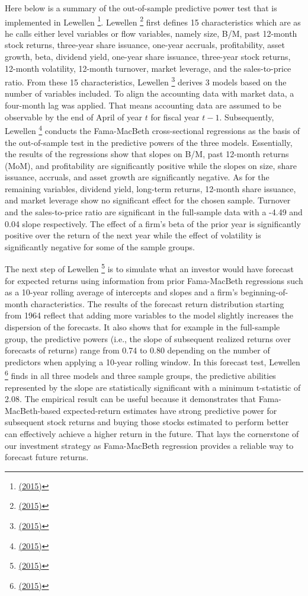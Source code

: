 \documentclass[a4paper,12pt]{article}
\begin{document}
Here below is a summary of the out-of-sample predictive power test that is implemented in Lewellen \footnote{\protect\hyperlink{ref-RN46}{(2015)}}. Lewellen \footnote{\protect\hyperlink{ref-RN46}{(2015)}} first defines 15 characteristics which are as he calls either level variables or flow variables, namely size, B/M, past 12-month stock returns, three-year share issuance, one-year accruals, profitability, asset growth, beta, dividend yield, one-year share issuance, three-year stock returns, 12-month volatility, 12-month turnover, market leverage, and the sales-to-price ratio. From these 15 characteristics, Lewellen \footnote{\protect\hyperlink{ref-RN46}{(2015)}} derives 3 models based on the number of variables included. To align the accounting data with market data, a four-month lag was applied. That means accounting data are assumed to be observable by the end of April of year \(t\) for fiscal year \(t-1\). Subsequently, Lewellen \footnote{\protect\hyperlink{ref-RN46}{(2015)}} conducts the Fama-MacBeth cross-sectional regressions as the basis of the out-of-sample test in the predictive powers of the three models. Essentially, the results of the regressions show that slopes on B/M, past 12-month returns (MoM), and profitability are significantly positive while the slopes on size, share issuance, accruals, and asset growth are significantly negative. As for the remaining variables, dividend yield, long-term returns, 12-month share issuance, and market leverage show no significant effect for the chosen sample. Turnover and the sales-to-price ratio are significant in the full-sample data with a -4.49 and 0.04 slope respectively. The effect of a firm's beta of the prior year is significantly positive over the return of the next year while the effect of volatility is significantly negative for some of the sample groups.

The next step of Lewellen \footnote{\protect\hyperlink{ref-RN46}{(2015)}} is to simulate what an investor would have forecast for expected returns using information from prior Fama-MacBeth regressions such as a 10-year rolling average of intercepts and slopes and a firm's beginning-of-month characteristics. The results of the forecast return distribution starting from 1964 reflect that adding more variables to the model slightly increases the dispersion of the forecasts. It also shows that for example in the full-sample group, the predictive powers (i.e., the slope of subsequent realized returns over forecasts of returns) range from 0.74 to 0.80 depending on the number of predictors when applying a 10-year rolling window. In this forecast test, Lewellen \footnote{\protect\hyperlink{ref-RN46}{(2015)}} finds in all three models and three sample groups, the predictive abilities represented by the slope are statistically significant with a minimum t-statistic of 2.08. The empirical result can be useful because it demonstrates that Fama-MacBeth-based expected-return estimates have strong predictive power for subsequent stock returns and buying those stocks estimated to perform better can effectively achieve a higher return in the future. That lays the cornerstone of our investment strategy as Fama-MacBeth regression provides a reliable way to forecast future returns.
\end{document}
